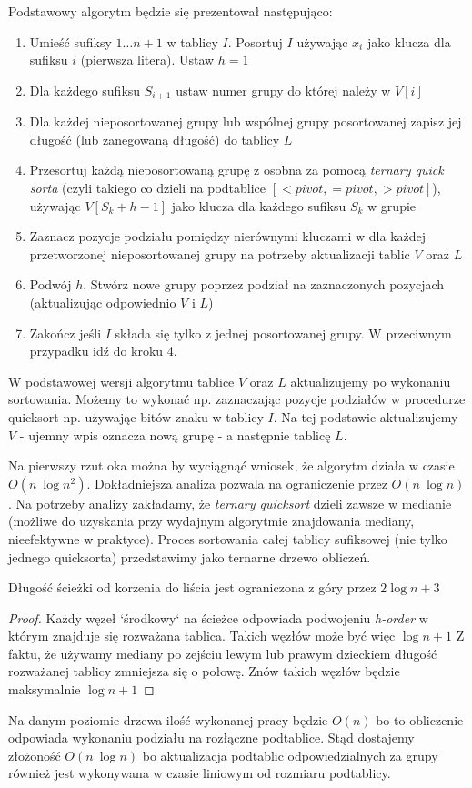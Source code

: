 Podstawowy algorytm będzie się prezentował następująco:
\begin{enumerate}
    \item Umieść sufiksy $1 \ldots n+1$ w tablicy $I$. Posortuj $I$ używając $x_i$ jako klucza dla sufiksu $i$ (pierwsza litera). Ustaw $h=1$
    \item Dla każdego sufiksu $S_{i+1}$ ustaw numer grupy do której należy w $V[i]$
    \item Dla każdej nieposortowanej grupy lub wspólnej grupy posortowanej zapisz jej długość (lub zanegowaną długość) do tablicy $L$
    \item Przesortuj każdą nieposortowaną grupę z osobna za pomocą \textit{ternary quick sorta} (czyli takiego co dzieli na podtablice $[< \textit{pivot}, = \textit{pivot}, > \textit{pivot}]$), używając $V[S_k + h - 1]$ jako klucza dla każdego sufiksu $S_k$ w grupie
    \item Zaznacz pozycje podziału pomiędzy nierównymi kluczami w dla każdej przetworzonej nieposortowanej grupy na potrzeby aktualizacji tablic $V$ oraz $L$
    \item Podwój $h$. Stwórz nowe grupy poprzez podział na zaznaczonych pozycjach (aktualizując odpowiednio $V$ i $L$)
    \item Zakończ jeśli $I$ składa się tylko z jednej posortowanej grupy. W przeciwnym przypadku idź do kroku 4.
\end{enumerate}

W podstawowej wersji algorytmu tablice $V$ oraz $L$ aktualizujemy po wykonaniu sortowania. Możemy to wykonać np. zaznaczając pozycje podziałów w procedurze quicksort np. używając bitów znaku w tablicy $I$. Na tej podstawie aktualizujemy $V$ - ujemny wpis oznacza nową grupę - a następnie tablicę $L$.

Na pierwszy rzut oka można by wyciągnąć wniosek, że algorytm działa w czasie $O(n\ \log{n}^2)$. Dokładniejsza analiza pozwala na ograniczenie przez $O(n\ \log{n})$. Na potrzeby analizy zakładamy, że \textit{ternary quicksort} dzieli zawsze w medianie (możliwe do uzyskania przy wydajnym algorytmie znajdowania mediany, nieefektywne w praktyce). Proces sortowania całej tablicy sufiksowej (nie tylko jednego quicksorta) przedstawimy jako ternarne drzewo obliczeń.

\begin{lemma}{}{}
Długość ścieżki od korzenia do liścia jest ograniczona z góry przez $2 \log{n} + 3$
\end{lemma}
\begin{proof}
Każdy węzeł `środkowy` na ścieżce odpowiada podwojeniu \textit{h-order} w którym znajduje się rozważana tablica. Takich węzłów może być więc $\log{n} + 1$ Z faktu, że używamy mediany po zejściu lewym lub prawym dzieckiem długość rozważanej tablicy zmniejsza się o połowę. Znów takich węzłów będzie maksymalnie $\log{n} + 1$
\end{proof}
Na danym poziomie drzewa ilość wykonanej pracy będzie $O(n)$ bo to obliczenie odpowiada wykonaniu podziału na rozłączne podtablice. Stąd dostajemy złożoność $O(n\ \log{n})$ bo aktualizacja podtablic odpowiedzialnych za grupy również jest wykonywana w czasie liniowym od rozmiaru podtablicy.

